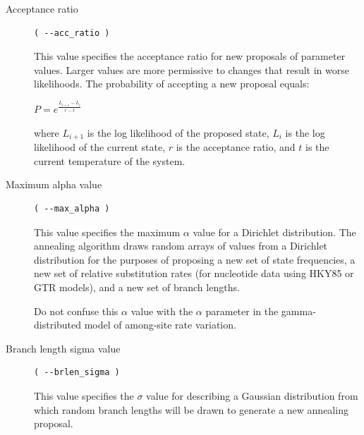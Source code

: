 \documentclass[11pt]{article}
\begin{document}
\begin{description}
\item[Acceptance ratio]
\begin{verbatim}
( --acc_ratio )
\end{verbatim}

This value specifies the acceptance ratio for new proposals of parameter values.  Larger values are more permissive to changes that result in worse likelihoods.  The probability of accepting a new proposal equals:

$P = e^{ \frac{L_{i+1} - L_{i}}{r - t} }$

where $L_{i+1}$ is the log likelihood of the proposed state, $L_i$ is the log likelihood of the current state, $r$ is the acceptance ratio, and $t$ is the current temperature of the system.





\item[Maximum alpha value]
\begin{verbatim}
( --max_alpha )
\end{verbatim}

This value specifies the maximum $\alpha$ value for a Dirichlet distribution.  The annealing algorithm draws random arrays of values from a Dirichlet distribution for the purposes of proposing a new set of state frequencies, a new set of relative substitution rates (for nucleotide data using HKY85 or GTR models), and a new set of branch lengths.

Do not confuse this $\alpha$ value with the $\alpha$ parameter in the gamma-distributed model of among-site rate variation.

\item[Branch length sigma value]
\begin{verbatim}
( --brlen_sigma )
\end{verbatim}

This value specifies the $\sigma$ value for describing a Gaussian distribution from which random branch lengths will be drawn to generate a new annealing proposal.


\end{description}
\end{document}

